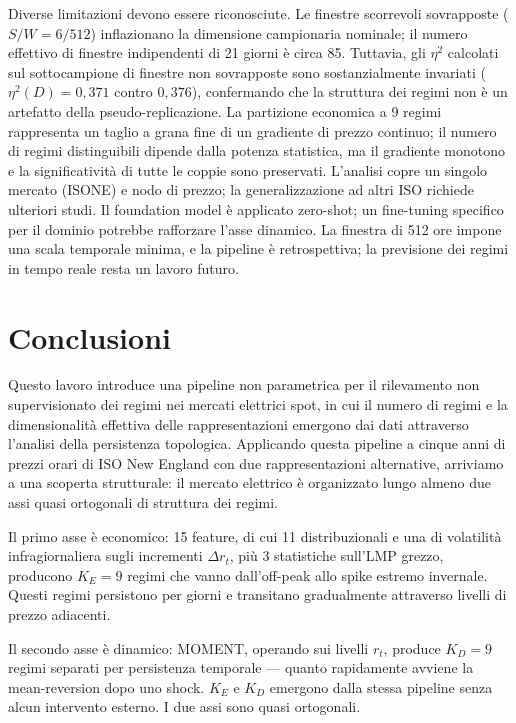 \documentclass[12pt]{article}
\begin{document}

Diverse limitazioni devono essere riconosciute.
Le finestre scorrevoli sovrapposte ($S/W = 6/512$) inflazionano la dimensione campionaria nominale; il numero effettivo di finestre indipendenti di 21 giorni è circa 85.
Tuttavia, gli $\eta^2$ calcolati sul sottocampione di finestre non sovrapposte sono sostanzialmente invariati ($\eta^2(D) = 0{,}371$ contro $0{,}376$), confermando che la struttura dei regimi non è un artefatto della pseudo-replicazione.
La partizione economica a 9 regimi rappresenta un taglio a grana fine di un gradiente di prezzo continuo; il numero di regimi distinguibili dipende dalla potenza statistica, ma il gradiente monotono e la significatività di tutte le coppie sono preservati.
L'analisi copre un singolo mercato (ISONE) e nodo di prezzo; la generalizzazione ad altri ISO richiede ulteriori studi.
Il foundation model è applicato zero-shot; un fine-tuning specifico per il dominio potrebbe rafforzare l'asse dinamico.
La finestra di 512 ore impone una scala temporale minima, e la pipeline è retrospettiva; la previsione dei regimi in tempo reale resta un lavoro futuro.


\section{Conclusioni}
\label{sec:conclusion}

Questo lavoro introduce una pipeline non parametrica per il rilevamento non supervisionato dei regimi nei mercati elettrici spot, in cui il numero di regimi e la dimensionalità effettiva delle rappresentazioni emergono dai dati attraverso l'analisi della persistenza topologica.
Applicando questa pipeline a cinque anni di prezzi orari di ISO New England con due rappresentazioni alternative, arriviamo a una scoperta strutturale: il mercato elettrico è organizzato lungo almeno due assi quasi ortogonali di struttura dei regimi.

Il primo asse è economico: 15 feature, di cui 11 distribuzionali e una di volatilità infragiornaliera sugli incrementi $\Delta r_t$, più 3 statistiche sull'LMP grezzo, producono $K_E = 9$ regimi che vanno dall'off-peak allo spike estremo invernale.
Questi regimi persistono per giorni e transitano gradualmente attraverso livelli di prezzo adiacenti.

Il secondo asse è dinamico: MOMENT, operando sui livelli $r_t$, produce $K_D = 9$ regimi separati per persistenza temporale --- quanto rapidamente avviene la mean-reversion dopo uno shock.
$K_E$ e $K_D$ emergono dalla stessa pipeline senza alcun intervento esterno.
I due assi sono quasi ortogonali.
\end{document}
